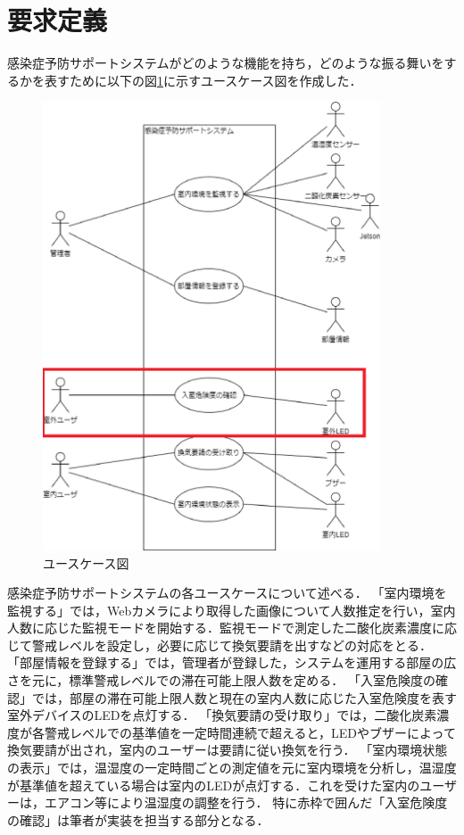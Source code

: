 
\section{要求定義}

感染症予防サポートシステムがどのような機能を持ち，どのような振る舞いをするかを表すために以下の図\ref{usecase1}に示すユースケース図を作成した．

\begin{figure}[htbp]
\centering
\includegraphics[width = 10cm]{./uml/usecase_e.eps}
\caption{ユースケース図}
\label{usecase1}
\end{figure}

感染症予防サポートシステムの各ユースケースについて述べる．
「室内環境を監視する」では，Webカメラにより取得した画像について人数推定を行い，室内人数に応じた監視モードを開始する．監視モードで測定した二酸化炭素濃度に応じて警戒レベルを設定し，必要に応じて換気要請を出すなどの対応をとる．
「部屋情報を登録する」では，管理者が登録した，システムを運用する部屋の広さを元に，標準警戒レベルでの滞在可能上限人数を定める．
「入室危険度の確認」では，部屋の滞在可能上限人数と現在の室内人数に応じた入室危険度を表す室外デバイスのLEDを点灯する．
「換気要請の受け取り」では，二酸化炭素濃度が各警戒レベルでの基準値を一定時間連続で超えると，LEDやブザーによって換気要請が出され，室内のユーザーは要請に従い換気を行う．
「室内環境状態の表示」では，温湿度の一定時間ごとの測定値を元に室内環境を分析し，温湿度が基準値を超えている場合は室内のLEDが点灯する．これを受けた室内のユーザーは，エアコン等により温湿度の調整を行う．
特に赤枠で囲んだ「入室危険度の確認」は筆者が実装を担当する部分となる．

